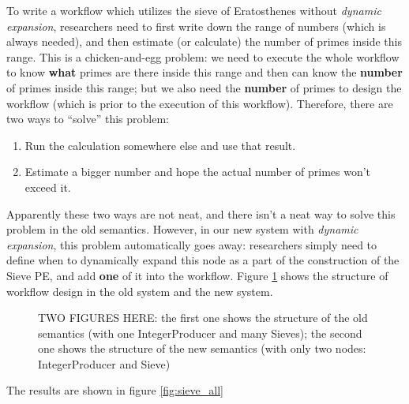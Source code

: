 \documentclass[•]{article}
\begin{document}
	To write a workflow which utilizes the sieve of Eratosthenes without \textit{dynamic expansion},  researchers need to first write down the range of numbers (which is always needed), and then estimate (or calculate) the number of primes inside this range. This is a chicken-and-egg problem: we need to execute the whole workflow to know \textbf{what} primes are there inside this range and then can know the \textbf{number} of primes inside this range; but we also need the \textbf{number} of primes to design the workflow (which is prior to the execution of this workflow). Therefore, there are two ways to ``solve'' this problem:
	\begin{enumerate}
		\item Run the calculation somewhere else and use that result.
		\item Estimate a bigger number and hope the actual number of primes won't exceed it.
	\end{enumerate}
	
	Apparently these two ways are not neat, and there isn't a neat way to solve this problem in the old semantics. However, in our new system with \textit{dynamic expansion}, this problem automatically goes away: researchers simply need to define when to dynamically expand this node as a part of the construction of the Sieve PE, and add \textbf{one} of it into the workflow. Figure \ref{fig:comp_old_new_sieve} shows the structure of workflow design in the old system and the new system.
	
	\begin{figure}[h]
	
	TWO FIGURES HERE:
	the first one shows the structure of the old semantics (with one IntegerProducer and many Sieves);
		the second one shows the structure of the new semantics (with only two nodes: IntegerProducer and Sieve)
		\label{fig:comp_old_new_sieve}
	\end{figure}
	
	The results are shown in figure \ref{fig:sieve_all}
	
\end{document}

